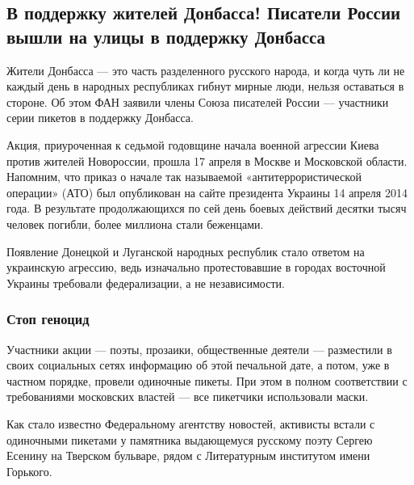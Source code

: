  
 
 
 
 
\subsection{В поддержку жителей Донбасса! Писатели России вышли на улицы в поддержку Донбасса}

Жители Донбасса — это часть разделенного русского народа, и когда чуть ли не
каждый день в народных республиках гибнут мирные люди, нельзя оставаться в
стороне. Об этом ФАН заявили члены Союза писателей России — участники серии
пикетов в поддержку Донбасса.

Акция, приуроченная к седьмой годовщине начала военной агрессии Киева против
жителей Новороссии, прошла 17 апреля в Москве и Московской области. Напомним,
что приказ о начале так называемой «антитеррористической операции» (АТО) был
опубликован на сайте президента Украины 14 апреля 2014 года. В результате
продолжающихся по сей день боевых действий десятки тысяч человек погибли, более
миллиона стали беженцами.

Появление Донецкой и Луганской народных республик стало ответом на украинскую
агрессию, ведь изначально протестовавшие в городах восточной Украины требовали
федерализации, а не независимости.

\subsubsection{Стоп геноцид}

Участники акции — поэты, прозаики, общественные деятели — разместили в своих
социальных сетях информацию об этой печальной дате, а потом, уже в частном
порядке, провели одиночные пикеты. При этом в полном соответствии с
требованиями московских властей — все пикетчики использовали маски.

Как стало известно Федеральному агентству новостей, активисты встали с
одиночными пикетами у памятника выдающемуся русскому поэту Сергею Есенину на
Тверском бульваре, рядом с Литературным институтом имени Горького.

